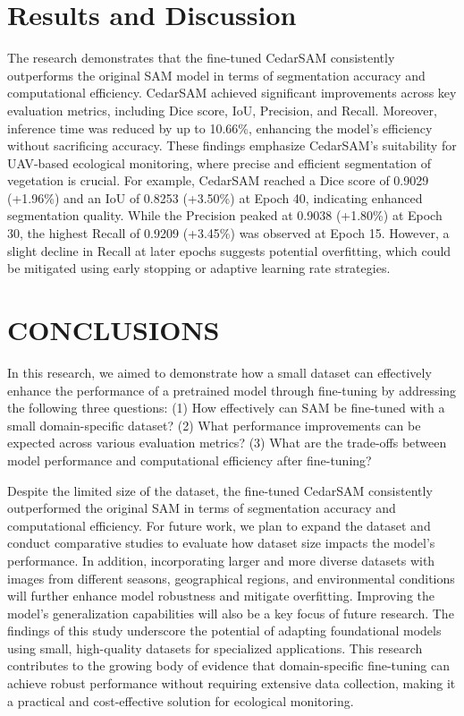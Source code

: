\documentclass[letterpaper, 10 pt, conference]{ieeeconf}  %
\begin{document}
\section{Results and Discussion}
The research demonstrates that the fine-tuned CedarSAM consistently outperforms the original SAM model in terms of segmentation accuracy and computational efficiency. CedarSAM achieved significant improvements across key evaluation metrics, including Dice score, IoU, Precision, and Recall. Moreover, inference time was reduced by up to 10.66\%, enhancing the model’s efficiency without sacrificing accuracy. These findings emphasize CedarSAM’s suitability for UAV-based ecological monitoring, where precise and efficient segmentation of vegetation is crucial. For example, CedarSAM reached a Dice score of 0.9029 (+1.96\%) and an IoU of 0.8253 (+3.50\%) at Epoch 40, indicating enhanced segmentation quality. While the Precision peaked at 0.9038 (+1.80\%) at Epoch 30, the highest Recall of 0.9209 (+3.45\%) was observed at Epoch 15. However, a slight decline in Recall at later epochs suggests potential overfitting, which could be mitigated using early stopping or adaptive learning rate strategies.

\section{CONCLUSIONS}
In this research, we aimed to demonstrate how a small dataset can effectively enhance the performance of a pretrained model through fine-tuning by addressing the following three questions: (1) How effectively can SAM be fine-tuned with a small domain-specific dataset? (2) What performance improvements can be expected across various evaluation metrics? (3) What are the trade-offs between model performance and computational efficiency after fine-tuning?

Despite the limited size of the dataset, the fine-tuned CedarSAM consistently outperformed the original SAM in terms of segmentation accuracy and computational efficiency. For future work, we plan to expand the dataset and conduct comparative studies to evaluate how dataset size impacts the model's performance. In addition, incorporating larger and more diverse datasets with images from different seasons, geographical regions, and environmental conditions will further enhance model robustness and mitigate overfitting. Improving the model's generalization capabilities will also be a key focus of future research. The findings of this study underscore the potential of adapting foundational models using small, high-quality datasets for specialized applications. This research contributes to the growing body of evidence that domain-specific fine-tuning can achieve robust performance without requiring extensive data collection, making it a practical and cost-effective solution for ecological monitoring.
\end{document}

